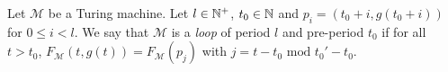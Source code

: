 







\begin{definition}[Loops]\label{def:loops}
    Let $\mathcal{M}$ be a Turing machine. Let $l\in\mathbb{N}^+$, $t_0 \in \mathbb{N}$ and $p_i = (t_0+i, g(t_0+i))$ for $0 \leq i < l$. We say that $\mathcal{M}$ is a \textit{loop} of period $l$ and pre-period $t_0$ if for all $t > t_0$, $F_\mathcal{M}(t,g(t)) = F_\mathcal{M}(p_j)$ with $j = t-t_0 \text{ mod } t_0' - t_0$.
\end{definition}


